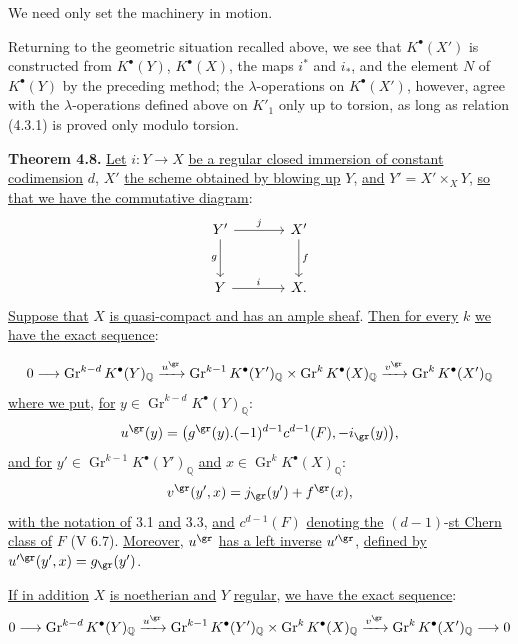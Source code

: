 We need only set the machinery in motion.

Returning to the geometric situation recalled above, we see that \(K^{\bullet}(X')\) is constructed from \(K^{\bullet}(Y)\), \(K^{\bullet}(X)\), the maps \(i^*\) and \(i_*\), and the element \(N\) of \(K^{\bullet}(Y)\) by the preceding method; the \(\lambda\)-operations on \(K^{\bullet}(X')\), however, agree with the \(\lambda\)-operations defined above on \(K'_1\) only up to torsion, as long as relation (4.3.1) is proved only modulo torsion.

\textbf{Theorem 4.8.} \uline{Let} \(i:Y\to X\) \uline{be a regular closed immersion of constant codimension} \(d\), \(X'\) \uline{the scheme obtained by blowing up} \(Y\), \uline{and} \(Y'=X'\times_XY\), \uline{so that we have the commutative diagram}:
\[
\begin{tikzcd}[column sep=large,row sep=large]
Y' \arrow[r,"j"] \arrow[d,"g"'] & X' \arrow[d,"f"]\\
Y \arrow[r,"i"] & X.
\end{tikzcd}
\]
\uline{Suppose that} \(X\) \uline{is quasi-compact and has an ample sheaf}. \uline{Then for every} \(k\) \uline{we have the exact sequence}:

%
\[
0\longrightarrow
\operatorname{Gr}^{k-d}K^{\bullet}(Y)_{\mathbb Q}
\xrightarrow{u^{\gr}}
\operatorname{Gr}^{k-1}K^{\bullet}(Y')_{\mathbb Q}
\times
\operatorname{Gr}^{k}K^{\bullet}(X)_{\mathbb Q}
\xrightarrow{v^{\gr}}
\operatorname{Gr}^{k}K^{\bullet}(X')_{\mathbb Q}
\]
\uline{where we put}, \uline{for} \(y\in \operatorname{Gr}^{k-d}K^{\bullet}(Y)_{\mathbb Q}\):
\[
  u^{\gr}(y)=
  \bigl(g^{\gr}(y).(-1)^{d-1}c^{d-1}(F),-i_{\gr}(y)\bigr),
\]
\uline{and for} \(y'\in \operatorname{Gr}^{k-1}K^{\bullet}(Y')_{\mathbb Q}\) \uline{and} \(x\in \operatorname{Gr}^{k}K^{\bullet}(X)_{\mathbb Q}\):
\[
  v^{\gr}(y',x)=j_{\gr}(y')+f^{\gr}(x),
\]
\uline{with the notation of} 3.1 \uline{and} 3.3, \uline{and} \(c^{d-1}(F)\) \uline{denoting the} \((d-1)\)-\uline{st Chern class of} \(F\) (V 6.7). \uline{Moreover}, \(u^{\gr}\) \uline{has a left inverse} \(u'^{\gr}\), \uline{defined by} \(u'^{\gr}(y',x)=g_{\gr}(y')\).

\uline{If in addition} \(X\) \uline{is noetherian and} \(Y\) \uline{regular}, \uline{we have the exact sequence}:
\[
0\longrightarrow
\operatorname{Gr}^{k-d}K^{\bullet}(Y)_{\mathbb Q}
\xrightarrow{u^{\gr}}
\operatorname{Gr}^{k-1}K^{\bullet}(Y')_{\mathbb Q}
\times
\operatorname{Gr}^{k}K^{\bullet}(X)_{\mathbb Q}
\xrightarrow{v^{\gr}}
\operatorname{Gr}^{k}K^{\bullet}(X')_{\mathbb Q}
\longrightarrow0
\]

